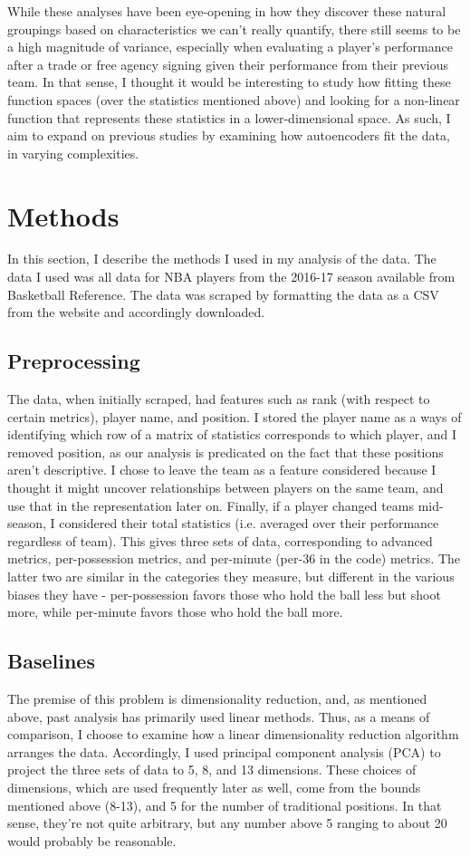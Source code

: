 \documentclass[12pt]{article}
\begin{document}
    While these analyses have been eye-opening in how they discover these natural groupings based on characteristics we can't really quantify, there still seems to be a high magnitude of variance, especially when evaluating a player's performance after a trade or free agency signing given their performance from their previous team. In that sense, I thought it would be interesting to study how fitting these function spaces (over the statistics mentioned above) and looking for a non-linear function that represents these statistics in a lower-dimensional space. As such, I aim to expand on previous studies by examining how autoencoders fit the data, in varying complexities.
    \section{Methods}
    In this section, I describe the methods I used in my analysis of the data. The data I used was all data for NBA players from the 2016-17 season available from Basketball Reference. The data was scraped by formatting the data as a CSV from the website and accordingly downloaded.
    \subsection{Preprocessing}
    The data, when initially scraped, had features such as rank (with respect to certain metrics), player name, and position. I stored the player name as a ways of identifying which row of a matrix of statistics corresponds to which player, and I removed position, as our analysis is predicated on the fact that these positions aren't descriptive. I chose to leave the team as a feature considered because I thought it might uncover relationships between players on the same team, and use that in the representation later on. Finally, if a player changed teams mid-season, I considered their total statistics (i.e. averaged over their performance regardless of team). This gives three sets of data, corresponding to advanced metrics, per-possession metrics, and per-minute (per-36 in the code) metrics. The latter two are similar in the categories they measure, but different in the various biases they have - per-possession favors those who hold the ball less but shoot more, while per-minute favors those who hold the ball more.
    \subsection{Baselines}
    The premise of this problem is dimensionality reduction, and, as mentioned above, past analysis has primarily used linear methods. Thus, as a means of comparison, I choose to examine how a linear dimensionality reduction algorithm arranges the data. Accordingly, I used principal component analysis (PCA) to project the three sets of data to 5, 8, and 13 dimensions. These choices of dimensions, which are used frequently later as well, come from the bounds mentioned above (8-13), and 5 for the number of traditional positions. In that sense, they're not quite arbitrary, but any number above 5 ranging to about 20 would probably be reasonable.
\end{document}
